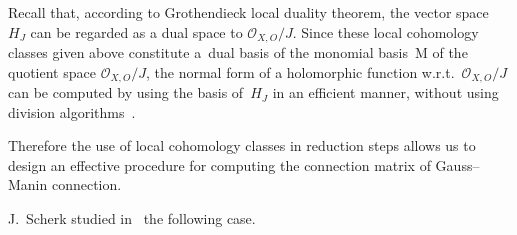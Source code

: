 \documentclass[pdftex]{sigma}%
\numberwithin{equation}{section}
\begin{document}
\begin{Remark}Recall that, according to Grothendieck local duality theorem, the vector space~$H_J$ can be regarded as a dual space to ${\mathcal O}_{X,O}/J$. Since these local cohomology classes given above constitute a~dual basis of the monomial basis~M of the quotient space $ {\mathcal O}_{X,O}/J$, the normal form of a holomorphic function w.r.t.~${\mathcal O}_{X,O}/J$ can be computed by using the basis of~$H_J$
in an efficient manner, without using division algorithms~\cite{TNN}.

Therefore the use of local cohomology classes in reduction steps allows us to design an effective procedure for computing the connection matrix of Gauss--Manin connection.
\end{Remark}

J.~Scherk studied in~\cite{Sch} the following case.
\end{document}
